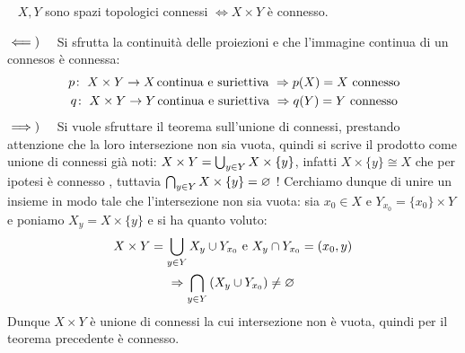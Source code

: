 \begin{theorema}~{}\label{prodotto connessi}
	$X, Y$ sono spazi topologici connessi $\iff X\times Y$ è connesso.	
\end{theorema}
\begin{demonstration}
	$\impliedby)\quad$ Si sfrutta la continuità delle proiezioni e che l'immagine continua di un connesos è connessa:
		\begin{gather*}
			\funz p {X\times Y} X \text{continua e suriettiva } \Rightarrow p(X)=X \text{ connesso} \\
			\funz q {X\times Y} Y \text{continua e suriettiva } \Rightarrow q(Y)=Y \text{ connesso}	
		\end{gather*}	
	$\implies)\quad$ Si vuole sfruttare il teorema sull'unione di connessi, prestando attenzione che la loro intersezione non sia vuota, quindi si scrive il prodotto come unione di connessi già noti:
	$X\times Y=\mathop{{\bigcup}}\displaylimits_{y\in Y}X\times\{y\}$, infatti $X\times\{y\}\cong X$ che per ipotesi è connesso , tuttavia $\mathop{{\bigcap}}\displaylimits_{y\in Y}X\times\{y\}=\varnothing$ !\newline
	Cerchiamo dunque di unire un insieme in modo tale che l'intersezione non sia vuota: sia $x_0\in X$ e $Y_{x_0}=\{x_0\}\times Y$ e poniamo $X_y=X\times\{y\}$ e si ha quanto voluto:
		\begin{gather*}
			X\times Y=\mathop{{\bigcup}}\displaylimits_{y\in Y}X_y \cup Y_{x_0} \text{ e } X_y\cap Y_{x_0}=(x_0,y)\\
			\Rightarrow \mathop{{\bigcap}}\displaylimits_{y\in Y}\left( X_y  \cup Y_{x_0}\right)\neq\varnothing		
		\end{gather*}
	Dunque $X\times Y$ è unione di connessi la cui intersezione non è vuota, quindi per il teorema precedente è connesso.
\end{demonstration}


